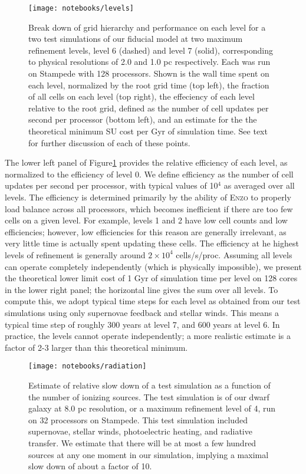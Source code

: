 \documentclass[11pt]{article}
\begin{document}
\begin{figure}
\centering
\texttt{[image: notebooks/levels]}
\caption{Break down of grid hierarchy and performance on each level for a two test simulations of our fiducial model at two maximum refinement levels, level 6 (dashed) and level 7 (solid), corresponding to physical resolutions of 2.0 and 1.0 pc respectively. Each was run on Stampede with 128 processors. Shown is the wall time spent on each level, normalized by the root grid time (top left), the fraction of all cells on each level (top right), the effeciency of each level relative to the root grid, defined as the number of cell updates per second per processor (bottom left), and an estimate for the the theoretical minimum SU cost per Gyr of simulation time. See text for further discussion of each of these points.}
\label{fig:levels}
\end{figure}

The lower left panel of Figure\ref{fig:levels} provides the relative efficiency of each level, as normalized to the efficiency of level 0. We define efficiency as the number of cell updates per second per processor, with typical values of 10$^4$ as averaged over all levels. The efficiency is determined primarily by the ability of \textsc{Enzo} to properly load balance across all processors, which becomes inefficient if there are too few cells on a given level. For example, levels 1 and 2 have low cell counts and low efficiencies; however, low efficiencies for this reason are generally irrelevant, as very little time is actually spent updating these cells. The efficiency at he highest levels of refinement is generally around $2\times 10^4$ cells/s/proc. Assuming all levels can operate completely independently (which is physically impossible), we present the theoretical lower limit cost of 1 Gyr of simulation time per level on 128 cores in the lower right panel; the horizontal line gives the sum over all levels. To compute this, we adopt typical time steps for each level as obtained from our test simulations using only supernovae feedback and stellar winds. This means a typical time step of roughly 300 years at level 7, and 600 years at level 6. In practice, the levels cannot operate independently; a more realistic estimate is a factor of 2-3 larger than this theoretical minimum.

\begin{figure}
\centering
\texttt{[image: notebooks/radiation]}
\caption{Estimate of relative slow down of a test simulation as a function of the number of ionizing sources. The test simulation is of our dwarf galaxy at 8.0 pc resolution, or a maximum refinement level of 4, run on 32 processors on Stampede. This test simulation included supernovae, stellar winds, photoelectric heating, and radiative transfer. We estimate that there will be at most a few hundred sources at any one moment in our simulation, implying a maximal slow down of about a factor of 10.}
\label{fig:radiation}
\end{figure}
\end{document}
